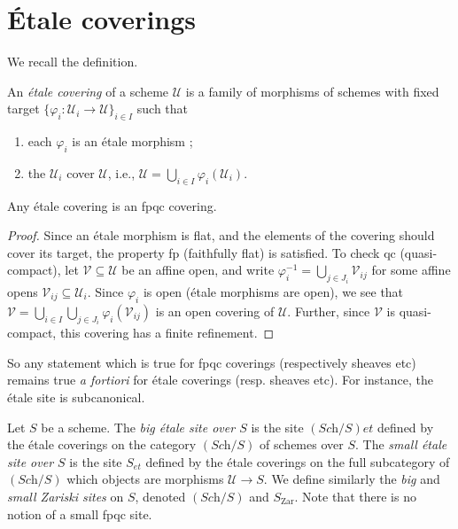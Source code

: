 \section{\'Etale coverings}
\label{section-etale-covering}

\noindent
We recall the definition.

\begin{definition}
\label{definition-etale-covering}
An {\it \'etale covering} of a scheme $\mathcal{U}$ is a family of morphisms
of schemes with fixed target $\{ \varphi_i : \mathcal{U}_i \to \mathcal{U}
\}_{i \in I}$ such that
\begin{enumerate}
\item each $\varphi_i$ is an \'etale morphism ;
\item the $\mathcal{U}_i$ cover $\mathcal{U}$, i.e., $\mathcal{U} =
\bigcup_{i\in I}\varphi_i(\mathcal{U}_i)$.
\end{enumerate}
\end{definition}

\begin{lemma}
\label{lemma-etale-fpqc}
Any \'etale covering is an fpqc covering.
\end{lemma}

\begin{proof}
Since an \'etale morphism is flat, and the elements of the covering should
cover its target, the property fp (faithfully flat) is satisfied. To check qc
(quasi-compact), let $\mathcal{V} \subseteq \mathcal{U}$ be an affine open, and
write $\varphi_i^{-1} = \bigcup_{j \in J_i} \mathcal{V}_{ij}$ for some affine
opens $\mathcal{V}_{ij} \subseteq \mathcal{U}_i$. Since $\varphi_i$ is open
(\'etale morphisms are open), we see that
$\mathcal{V} = \bigcup_{i\in I}\bigcup_{j \in J_i}
\varphi_i(\mathcal{V}_{ij})$
is an open covering of $\mathcal{U}$.
Further, since $\mathcal{V}$ is quasi-compact, this covering has a finite
refinement.
\end{proof}

\noindent
So any statement which is true for fpqc coverings (respectively sheaves etc)
remains true {\it a fortiori} for \'etale coverings (resp. sheaves etc). For
instance, the \'etale site is subcanonical.

\begin{definition}
\label{definition-big-etale-site}
Let $S$ be a scheme. The {\it big \'etale site over $S$} is the site
$(\textit{Sch}/S)et$ defined by the \'etale coverings on the category
$(\textit{Sch}/S)$ of schemes over $S$. The
{\it small \'etale site over $S$} is
the site $S_{et}$ defined by the \'etale coverings on the full subcategory of
$(\textit{Sch}/S)$ which objects are morphisms $\mathcal{U} \to S$. We define
similarly the {\it big} and {\it small Zariski sites} on $S$, denoted
$(\textit{Sch}/S)$ and $S_\mathrm{Zar}$. Note that there is no notion
of a small fpqc site.
\end{definition}

